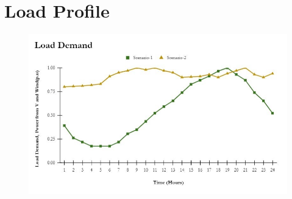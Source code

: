	
	\section{Load Profile}
		\begin{figure}
			\centering
			\includegraphics[width=0.7\linewidth]{Figures/load_demand}
			\caption{}
			\label{fig:loaddemand}
		\end{figure}
		

		
	
		
	
	
